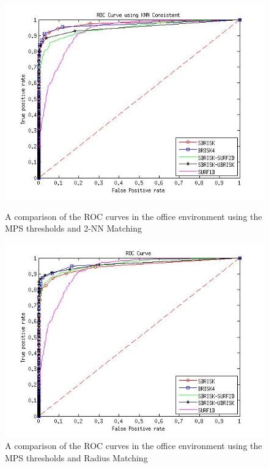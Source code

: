 \documentclass[11pt]{report}
\begin{document}



\begin{figure}[h!]
\begin{minipage}[b]{0.5\linewidth}
\includegraphics[scale=0.4]{../Drawings/dataset2_ROC_General_KNN.jpg}
\caption{A comparison of the ROC curves in the office environment using the MPS thresholds and 2-NN Matching}
\label{fig:compareKnnOffice}
\end{minipage}
\hspace{0.5cm}
\begin{minipage}[b]{0.5\linewidth}
\includegraphics[scale=0.4]{../Drawings/dataset2_ROC_General_Hamming.jpg}
\caption{A comparison of the ROC curves in the office environment using the MPS thresholds and Radius Matching}
\label{fig:compareHammingOffice}
\end{minipage}

\end{figure}
\end{document}
